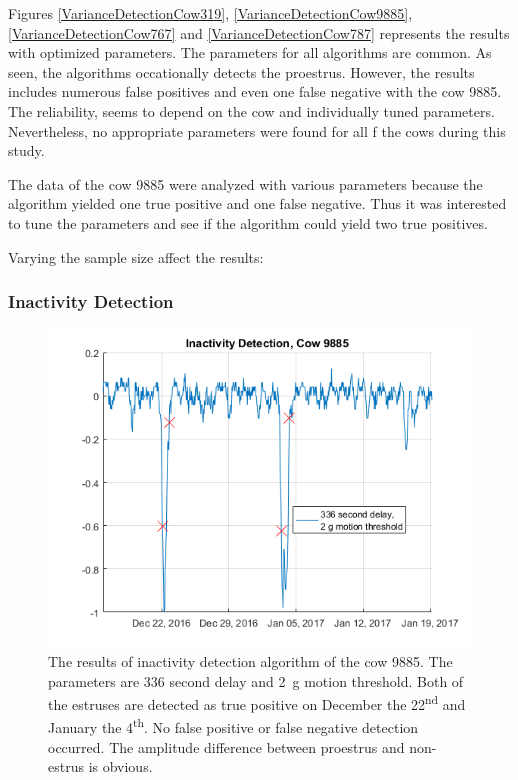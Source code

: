 \documentclass[english,12pt,a4paper,pdftex,elec,utf8]{aaltothesis}
\begin{document}
Figures \ref{VarianceDetectionCow319}, \ref{VarianceDetectionCow9885}, \ref{VarianceDetectionCow767} and \ref{VarianceDetectionCow787} represents the results with optimized parameters. The parameters for all algorithms are common. As seen, the algorithms occationally detects the proestrus. However, the results includes numerous false positives and even one false negative with the cow 9885. The reliability, seems to depend on the cow and individually tuned parameters. Nevertheless, no appropriate parameters were found for all f the cows during this study.

The data of the cow 9885 were analyzed with various parameters because the algorithm yielded one true positive and one false negative. Thus it was interested to tune the parameters and see if the algorithm could yield two true positives.


Varying the sample size affect the results:







\subsubsection{Inactivity Detection}\label{inactivitydetectionevaluation}

\begin{figure}[htb]
\centering
\includegraphics[width = 0.75 \textwidth]{figures/InactivityDetectionCow9885.png}
\caption{The results of inactivity detection algorithm of the cow 9885. The parameters are 336 second delay and \SI{2}{\gram} motion threshold. Both of the estruses are detected as true positive on December the 22\textsuperscript{nd} and January the 4\textsuperscript{th}. No false positive or false negative detection occurred. The amplitude difference between proestrus and non-estrus is obvious.}
\label{InactivityDetectionCow9885}
\end{figure}
\end{document}
